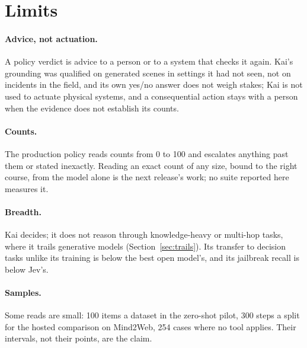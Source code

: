 \section{Limits}
\label{sec:limits}

\paragraph{Advice, not actuation.} A policy verdict is advice to a person or to
a system that checks it again. Kai's grounding was qualified on generated
scenes in settings it had not seen, not on incidents in the field, and its own
yes/no answer does not weigh stakes; Kai is not used to actuate physical
systems, and a consequential action stays with a person when the evidence does
not establish its counts.

\paragraph{Counts.} The production policy reads counts from 0 to 100 and
escalates anything past them or stated inexactly. Reading an exact count of
any size, bound to the right course, from the model alone is the next release's
work; no suite reported here measures it.

\paragraph{Breadth.} Kai decides; it does not reason through knowledge-heavy or
multi-hop tasks, where it trails generative models (Section~\ref{sec:trails}).
Its transfer to decision tasks unlike its training is below the best open
model's, and its jailbreak recall is below Jev's.

\paragraph{Samples.} Some reads are small: 100 items a dataset in the zero-shot
pilot, 300 steps a split for the hosted comparison on Mind2Web, 254 cases where
no tool applies. Their intervals, not their points, are the claim.

